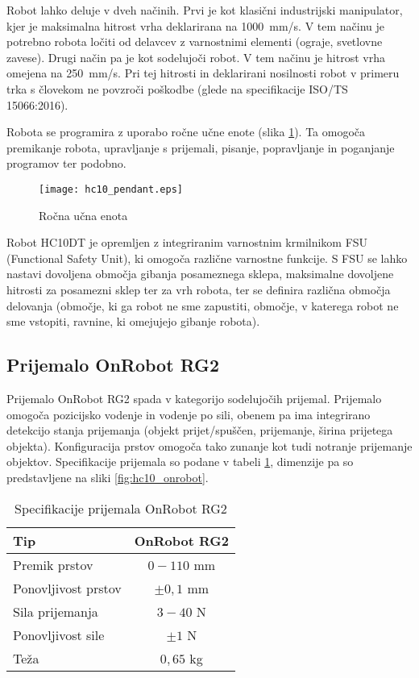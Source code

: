 Robot lahko deluje v dveh načinih. Prvi je kot klasični industrijski manipulator, kjer je maksimalna hitrost vrha deklarirana na 1000~mm/s. V tem načinu je potrebno robota ločiti od delavcev z varnostnimi elementi (ograje, svetlovne zavese). Drugi način pa je kot sodelujoči robot. V tem načinu je hitrost vrha omejena na 250~mm/s. Pri tej hitrosti in deklarirani nosilnosti robot v primeru trka s človekom ne povzroči poškodbe (glede na specifikacije ISO/TS 15066:2016).

Robota se programira z uporabo ročne učne enote (slika \ref{fig:hc10_pendant}). Ta omogoča premikanje robota, upravljanje s prijemali, pisanje, popravljanje in poganjanje programov ter podobno.

\begin{figure}[!hbt]
	\centering
	\texttt{[image: hc10\_pendant.eps]}
	\caption{Ročna učna enota}
	\label{fig:hc10_pendant}
\end{figure}

Robot HC10DT je opremljen z integriranim varnostnim krmilnikom FSU (Functional Safety Unit), ki omogoča različne varnostne funkcije. S FSU se lahko nastavi dovoljena območja gibanja posameznega sklepa, maksimalne dovoljene hitrosti za posamezni sklep ter za vrh robota, ter se definira različna območja delovanja (območje, ki ga robot ne sme zapustiti, območje, v katerega robot ne sme vstopiti, ravnine, ki omejujejo gibanje robota).




\subsection{Prijemalo OnRobot RG2}

Prijemalo OnRobot RG2 spada v kategorijo sodelujočih prijemal. Prijemalo omogoča pozicijsko vodenje in vodenje po sili, obenem pa ima integrirano detekcijo stanja prijemanja (objekt prijet/spuščen, prijemanje, širina prijetega objekta). Konfiguracija prstov omogoča tako zunanje kot tudi notranje prijemanje objektov. Specifikacije prijemala so podane v tabeli \ref{tab:RG2}, dimenzije pa so predstavljene na sliki \ref{fig:hc10_onrobot}.

\begin{table}
	\centering
	\caption{Specifikacije prijemala OnRobot RG2}
	\label{tab:RG2}
	\begin{tabular}{|l|c|}
		\hline Tip                  & OnRobot RG2 \\
		\hline Premik prstov        & $0-110$ mm \\
		\hline Ponovljivost prstov   & $\pm 0,1$ mm \\
		\hline Sila prijemanja      & $3-40$ N \\
		\hline Ponovljivost sile    & $\pm 1$ N \\
		\hline Teža                 & $0,65$ kg \\
		\hline
	\end{tabular}
\end{table}


